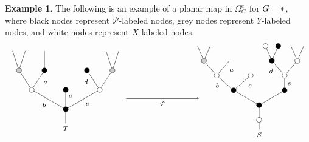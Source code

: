 \documentclass[a4paper,10pt
,draft
]{article}%
\numberwithin{equation}{section}
\numberwithin{figure}{section}
\theoremstyle{definition} %
\newtheorem{example}[equation]{Example}%
\newcommand{\1}{\ensuremath{\mathbbm 1}}%
\begin{document}
\begin{example}\label{REGALTERNMAP EX}
The following  is an example of a planar map in $\Omega_G^e$ for $G=\**$, where black nodes represent $\mathcal{P}$-labeled nodes, grey nodes represent $Y$-labeled nodes,
and white nodes represent $X$-labeled nodes.
\[
\begin{tikzpicture}[grow=up,auto,level distance=2.3em,
every node/.style = {font=\footnotesize},
dummy/.style={circle,draw,inner sep=0pt,minimum size=2.1mm}]
	\tikzstyle{level 2}=[sibling distance = 4em]
	\tikzstyle{level 3}=[sibling distance = 3em]
	\tikzstyle{level 4}=[sibling distance = 1.5em]
	\node at (0,0.25) {$T$}
		child{node [dummy,fill = black] {}
			child{node [dummy,fill=white] {}
				child{node [dummy,fill = black!20] {}
					child
					child
				}
				child{node [dummy,fill = black] {}
				edge from parent node [near end] {$d$}}
			edge from parent node [swap] {$e$}}
			child{node [dummy,fill=black] {}
			edge from parent node [swap, near end] {$c$}}
			child{node [dummy,fill=white] {}
				child{node [dummy,fill = black] {}
					child
				edge from parent node [swap, near end] {$a\phantom{d}$}}
				child{node [dummy,fill = black!20] {}
					child
					child
				}
			edge from parent node {$b$}}
		};
\begin{scope}[level distance=1.75em]
	\tikzstyle{level 3}=[sibling distance = 6em]
	\tikzstyle{level 4}=[sibling distance = 4em]
	\tikzstyle{level 5}=[sibling distance = 3em]
	\tikzstyle{level 6}=[sibling distance = 1.5em]
	\tikzstyle{level 7}=[sibling distance = 0.75em]
	\node at (8,0) {$S$}
		child{node [dummy,fill = white] {}
			child{node [dummy,fill = black] {}
				child{node [dummy,fill = black] {}
					child{node [dummy,fill=white] {}
						child{node [dummy,fill = white] {}
							child
							child
						}
						child{node [dummy,fill = black] {}
							child{node [dummy,fill=black] {}
						}
							child{node [dummy,fill=white] {}}
						edge from parent node [near end] {$d$}}
					edge from parent node [swap] {$e\phantom{1}$}}
				}
				child{node [dummy,fill = black] {}
					child{node [dummy,fill=white] {}
					edge from parent node [swap, near end] {$c\phantom{1}$}}
					child{node [dummy,fill=white] {}
						child{
						edge from parent node [swap,near end] {$a\phantom{d}$}}
						child{node [dummy,fill = black!20] {}
							child
							child
						}
					edge from parent node [near end] {$\phantom{1}b$}}
				}
			}
		};
\end{scope}
	\draw [->] (2.5,1.5) -- node [swap] {$\varphi$} (5.5,1.5);
\end{tikzpicture}
\]
\end{example}
\end{document}
